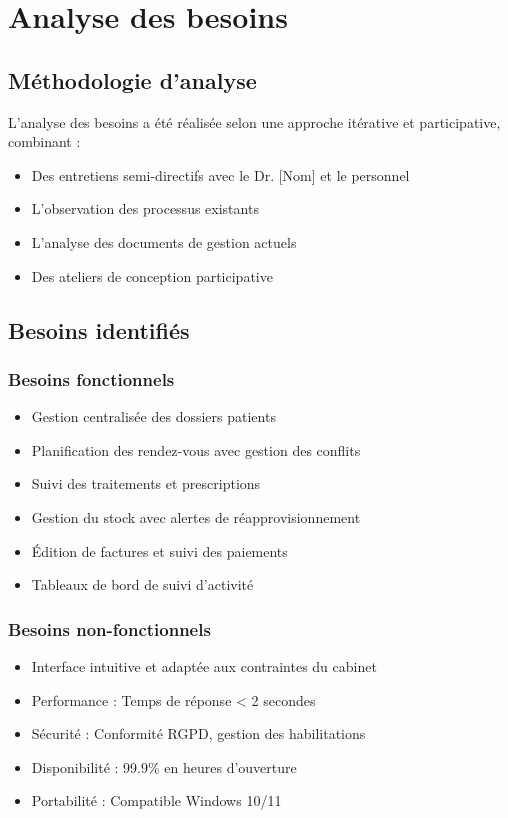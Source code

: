 \documentclass[12pt,a4paper]{report}
\begin{document}
\chapter{Analyse des besoins}
\section{Méthodologie d'analyse}
L'analyse des besoins a été réalisée selon une approche itérative et participative, combinant :
\begin{itemize}
    \item Des entretiens semi-directifs avec le Dr. [Nom] et le personnel
    \item L'observation des processus existants
    \item L'analyse des documents de gestion actuels
    \item Des ateliers de conception participative
\end{itemize}

\section{Besoins identifiés}
\subsection{Besoins fonctionnels}
\begin{itemize}
    \item Gestion centralisée des dossiers patients
    \item Planification des rendez-vous avec gestion des conflits
    \item Suivi des traitements et prescriptions
    \item Gestion du stock avec alertes de réapprovisionnement
    \item Édition de factures et suivi des paiements
    \item Tableaux de bord de suivi d'activité
\end{itemize}

\subsection{Besoins non-fonctionnels}
\begin{itemize}
    \item Interface intuitive et adaptée aux contraintes du cabinet
    \item Performance : Temps de réponse < 2 secondes
    \item Sécurité : Conformité RGPD, gestion des habilitations
    \item Disponibilité : 99.9\% en heures d'ouverture
    \item Portabilité : Compatible Windows 10/11
\end{itemize}
\end{document}
